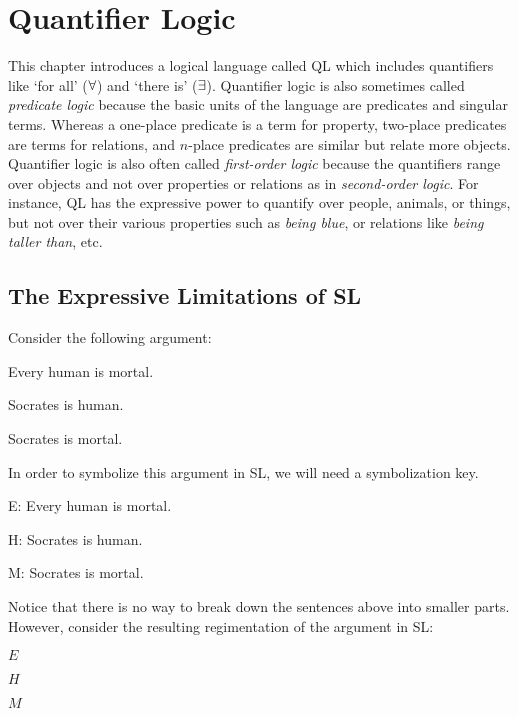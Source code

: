 \chapter{Quantifier Logic}
\label{ch.FOL-syntax}

This chapter introduces a logical language called QL which includes quantifiers like `for all' ($\forall$) and `there is' ($\exists$).
Quantifier logic is also sometimes called \emph{predicate logic} because the basic units of the language are predicates and singular terms.
Whereas a one-place predicate is a term for property, two-place predicates are terms for relations, and $n$-place predicates are similar but relate more objects.
Quantifier logic is also often called \textit{first-order logic} because the quantifiers range over objects and not over properties or relations as in \textit{second-order logic}.
For instance, QL has the expressive power to quantify over people, animals, or things, but not over their various properties such as \textit{being blue}, or relations like \textit{being taller than}, etc.




\section{The Expressive Limitations of SL}

Consider the following argument:

\begin{earg}
  \item[] Every human is mortal.
  \item[] Socrates is human.
  \item[\therefore] Socrates is mortal.
\end{earg}

In order to symbolize this argument in SL, we will need a symbolization key. 

\begin{ekey}
  \item[E:] Every human is mortal.
  \item[H:] Socrates is human.
  \item[M:] Socrates is mortal.
\end{ekey}

Notice that there is no way to break down the sentences above into smaller parts.
However, consider the resulting regimentation of the argument in SL:

\begin{earg}
  \item[] $E$
  \item[] $H$
  \item[\therefore] $M$
\end{earg}

